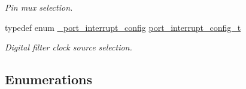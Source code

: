 \begin{DoxyCompactItemize}
\begin{DoxyCompactList}\small\item\em Pin mux selection. \end{DoxyCompactList}\item 
typedef enum \hyperlink{group__port__hal_ga3d53eb7c567ef2777ecdd7d146381bcf}{\+\_\+port\+\_\+interrupt\+\_\+config} \hyperlink{group__port__hal_ga54da044f13951cd799e647eafb825536}{port\+\_\+interrupt\+\_\+config\+\_\+t}
\begin{DoxyCompactList}\small\item\em Digital filter clock source selection. \end{DoxyCompactList}\end{DoxyCompactItemize}
\subsection*{Enumerations}
